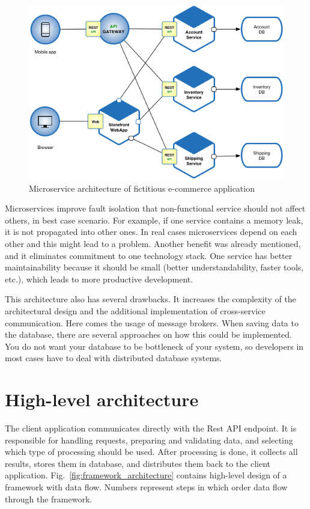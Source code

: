 \begin{figure}[H]
    \centering
    \includegraphics[width=.7\linewidth]{other-fig/microservice_architecture.png}
    \caption{Microservice architecture of fictitious e-commerce application}
    \label{fig:microservice_architecture}
\end{figure}

Microservices improve fault isolation that non-functional service should not affect others, in best case scenario. For example, if one service contains a memory leak, it is not propagated into other ones. In real cases microservices depend on each other and this might lead to a problem. Another benefit was already mentioned, and it eliminates commitment to one technology stack. One service has better maintainability because it should be small (better understandability, faster tools, etc.), which leads to more productive development.

This architecture also has several drawbacks. It increases the complexity of the architectural design and the additional implementation of cross-service communication. Here comes the usage of message brokers. When saving data to the database, there are several approaches on how this could be implemented. You do not want your database to be bottleneck of your system, so developers in most cases have to deal with distributed database systems.~\cite{MicroserviceArchitecture}

\section{High-level architecture}

The client application communicates directly with the Rest API endpoint. It is responsible for handling requests, preparing and validating data, and selecting which type of processing should be used. After processing is done, it collects all results, stores them in database, and distributes them back to the client application. Fig.~\ref{fig:framework_architecture} contains high-level design of a framework with data flow. Numbers represent steps in which order data flow through the framework.

